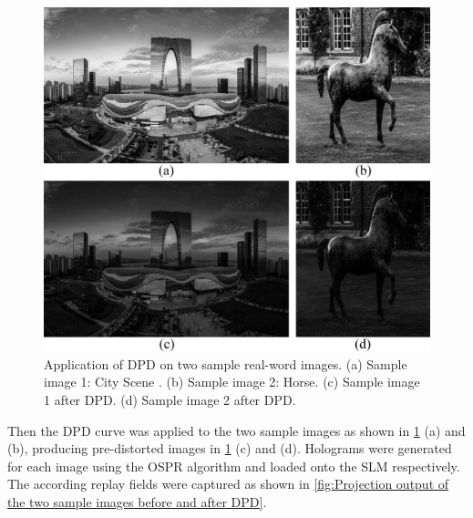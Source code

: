 \begin{figure}[H]
    \centering
    \includegraphics[width=\textwidth]{Application_of_DPD_on_two_sample_real-word_images.jpg}
    \caption{Application of DPD on two sample real-word images. (a) Sample image 1: City Scene \cite{Zhao2017}. (b) Sample image 2: Horse. (c) Sample image 1 after DPD. (d) Sample image 2 after DPD.}
    \label{fig:Application of DPD on two sample real-word image}
\end{figure}
\vspace{3mm}

Then the DPD curve was applied to the two sample images as shown in \cref{fig:Application of DPD on two sample real-word image} (a) and (b), producing pre-distorted images in \cref{fig:Application of DPD on two sample real-word image} (c) and (d). Holograms were generated for each image using the OSPR algorithm and loaded onto the SLM respectively. The according replay fields were captured as shown in \cref{fig:Projection output of the two sample images before and after DPD}.

